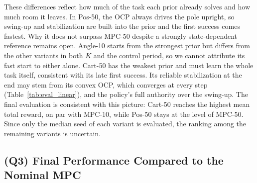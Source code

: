 \documentclass{l4dc2027}
\newcommand{\zoppos}{Pos-50\xspace}
\newcommand{\zopcart}{Cart-50\xspace}
\newcommand{\zopangleten}{Angle-10\xspace}
\newcommand{\mpcfifty}{MPC-50\xspace}
\newcommand{\mpcten}{MPC-10\xspace}
\begin{document}
These differences reflect how much of the task each prior already solves and
how much room it leaves. In \zoppos, the OCP always drives the pole upright,
so swing-up and stabilization are built into the prior and the first success
comes fastest. Why it does not surpass \mpcfifty despite a strongly
state-dependent reference remains open.
\zopangleten starts from the strongest prior but differs from the other
variants in both $K$ and the control period, so we cannot attribute its fast
start to either alone. \zopcart has the weakest prior and must learn the whole
task itself, consistent with its late first success. Its reliable
stabilization at the end may stem from its convex OCP, which converges at
every step (Table~\ref{tab:eval_linear}), and the policy's full authority over
the swing-up. The final evaluation is consistent with this picture: \zopcart reaches the
highest mean total reward, on par with \mpcten, while \zoppos stays at the
level of \mpcfifty. Since only the median seed of each variant is evaluated,
the ranking among the remaining variants is uncertain.

\subsection{(Q3) Final Performance Compared to the Nominal MPC}
\label{sec:res-final}
\end{document}

